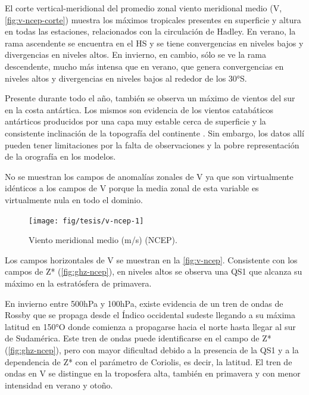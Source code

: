 \documentclass[spanish,a4paper,12pt,oneside]{book}
\begin{document}
El corte vertical-meridional del promedio zonal viento meridional medio
(V, \autoref{fig:v-ncep-corte}) muestra los máximos tropicales presentes
en superficie y altura en todas las estaciones, relacionados con la
circulación de Hadley. En verano, la rama ascendente se encuentra en el
HS y se tiene convergencias en niveles bajos y divergencias en niveles
altos. En invierno, en cambio, sólo se ve la rama descendente, mucho más
intensa que en verano, que genera convergencias en niveles altos y
divergencias en niveles bajos al rededor de los 30°S.

Presente durante todo el año, también se observa un máximo de vientos
del sur en la costa antártica. Los mismos son evidencia de los vientos
catabáticos antárticos producidos por una capa muy estable cerca de
superficie y la consistente inclinación de la topografía del continente
\autocite{King1997}. Sin embargo, los datos allí pueden tener
limitaciones por la falta de observaciones y la pobre representación de
la orografía en los modelos.

No se muestran los campos de anomalías zonales de V ya que son
virtualmente idénticos a los campos de V porque la media zonal de esta
variable es virtualmente nula en todo el dominio.

\begin{landscape}\begin{figure}

{\centering \texttt{[image: fig/tesis/v-ncep-1]} 

}

\caption{Viento meridional medio (m/s) (NCEP).}\label{fig:v-ncep}
\end{figure}
\end{landscape}

Los campos horizontales de V se muestran en la \autoref{fig:v-ncep}.
Consistente con los campos de Z* (\autoref{fig:ghz-ncep}), en niveles
altos se observa una QS1 que alcanza su máximo en la estratósfera de
primavera.

En invierno entre 500hPa y 100hPa, existe evidencia de un tren de ondas
de Rossby que se propaga desde el Índico occidental sudeste llegando a
su máxima latitud en 150°O donde comienza a propagarse hacia el norte
hasta llegar al sur de Sudamérica. Este tren de ondas puede
identificarse en el campo de Z* (\autoref{fig:ghz-ncep}), pero con mayor
dificultad debido a la presencia de la QS1 y a la dependencia de Z* con
el parámetro de Coriolis, es decir, la latitud. El tren de ondas en V se
distingue en la troposfera alta, también en primavera y con menor
intensidad en verano y otoño.
\end{document}
